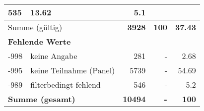 \begin{longtable}{lXrrr}
       \num{535} &
       \num[round-mode=places,round-precision=2]{13.62} &
         \num[round-mode=places,round-precision=2]{5.1} \\
     \midrule
     \multicolumn{2}{l}{Summe (gültig)} &
       \textbf{\num{3928}} &
     \textbf{\num{100}} &
       \textbf{\num[round-mode=places,round-precision=2]{37.43}} \\
     \multicolumn{5}{l}{\textbf{Fehlende Werte}}\\
       -998 &
       keine Angabe &
         \num{281} &
        - &
         \num[round-mode=places,round-precision=2]{2.68} \\
       -995 &
       keine Teilnahme (Panel) &
         \num{5739} &
        - &
         \num[round-mode=places,round-precision=2]{54.69} \\
       -989 &
       filterbedingt fehlend &
         \num{546} &
        - &
         \num[round-mode=places,round-precision=2]{5.2} \\
     \midrule
     \multicolumn{2}{l}{\textbf{Summe (gesamt)}} &
          \textbf{\num{10494}} &
        \textbf{-} &
        \textbf{\num{100}} \\
     \bottomrule
     \end{longtable}
     
